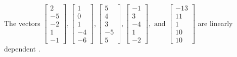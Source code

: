 \begin{exercise}
\begin{exerciseStatement}
  \end{exerciseStatement}
  \begin{exerciseAnswer}
   The vectors \(\left[\begin{array}{r}
2 \\
-5 \\
-2 \\
1 \\
-1
\end{array}\right] , \left[\begin{array}{r}
1 \\
0 \\
1 \\
-4 \\
-6
\end{array}\right] , \left[\begin{array}{r}
5 \\
4 \\
3 \\
-5 \\
5
\end{array}\right] , \left[\begin{array}{r}
-1 \\
3 \\
-4 \\
1 \\
-2
\end{array}\right] , \text{ and } \left[\begin{array}{r}
-13 \\
11 \\
1 \\
10 \\
10
\end{array}\right]\) are 
  	 linearly dependent  .
  


  \end{exerciseAnswer}
\end{exercise}